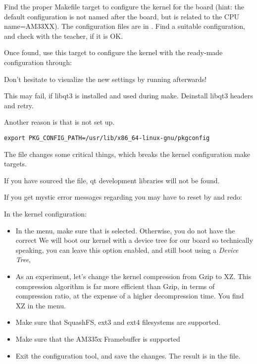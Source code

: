 Find the proper Makefile target to configure the kernel for the \devboard board 
(hint: the default configuration is not named after the board, but is related to the CPU
name=AM33XX). The configuration files are in .
Find a suitable configuration, and check with the teacher, if it is OK.

Once found, use this target to configure the kernel with the
ready-made configuration through:


Don't hesitate to visualize the new settings by running
 afterwards!

This may fail, if libqt3 is installed and used during make.
Deinstall libqt3 headers and retry.

Another reason is that  is not set up.

\begin{verbatim}
export PKG_CONFIG_PATH=/usr/lib/x86_64-linux-gnu/pkgconfig
\end{verbatim}

The  file changes some critical things, which breaks
the kernel configuration make targets.

If you have sourced the file, qt development libraries will not be found.

If you get mystic error messages regarding 
you may have to reset by  and redo:


In the kernel configuration:

\begin{itemize}

\item In the  menu, make sure that  is selected.
  Otherwise, you do not have the correct 
  We will boot our kernel with a device tree for our board so
  technically speaking, you can leave this option enabled,
  and still boot using a {\em Device Tree}, 

\item As an experiment, let's change the kernel compression from Gzip
  to XZ. This compression algorithm is far more efficient than Gzip,
  in terms of compression ratio, at the expense of a higher
  decompression time. You find XZ in the  menu.

\item Make sure that SquashFS, ext3 and ext4 filesystems are supported.

\item Make sure that the AM335x Framebuffer is supported

\item Exit the configuration tool, and save the changes.  The result
  is in the  file.

\end{itemize}

